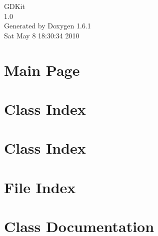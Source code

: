 \documentclass[a4paper]{book}
\begin{document}
\hypersetup{pageanchor=false}
\begin{titlepage}
\vspace*{7cm}
\begin{center}
{\Large GDKit \\[1ex]\large 1.0 }\\
\vspace*{1cm}
{\large Generated by Doxygen 1.6.1}\\
\vspace*{0.5cm}
{\small Sat May 8 18:30:34 2010}\\
\end{center}
\end{titlepage}
\clearemptydoublepage
{}
\tableofcontents
\clearemptydoublepage
{}
\hypersetup{pageanchor=true}
\chapter{Main Page}
\label{index}\hypertarget{index}{}
\chapter{Class Index}

\chapter{Class Index}

\chapter{File Index}

\chapter{Class Documentation}








































\end{document}
